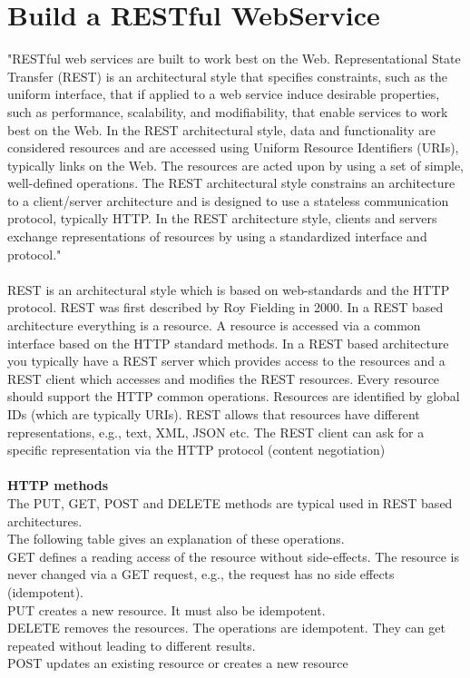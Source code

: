\documentclass[12pt]{article}
\begin{document}
\section{Build a RESTful WebService}
"RESTful web services are built to work best on the Web. Representational State Transfer (REST) is an architectural style that specifies constraints, such as the uniform interface, that if applied to a web service induce desirable properties, such as performance, scalability, and modifiability, that enable services to work best on the Web. In the REST architectural style, data and functionality are considered resources and are accessed using Uniform Resource Identifiers (URIs), typically links on the Web. The resources are acted upon by using a set of simple, well-defined operations. The REST architectural style constrains an architecture to a client/server architecture and is designed to use a stateless communication protocol, typically HTTP. In the REST architecture style, clients and servers exchange representations of resources by using a standardized interface and protocol."\cite{javaEE6}
\\\\
REST is an architectural style which is based on web-standards and the HTTP protocol. REST was first described by Roy Fielding in 2000.
In a REST based architecture everything is a resource. A resource is accessed via a common interface based on the HTTP standard methods.
In a REST based architecture you typically have a REST server which provides access to the resources and a REST client which accesses and modifies the REST resources.
Every resource should support the HTTP common operations. Resources are identified by global IDs (which are typically URIs).
REST allows that resources have different representations, e.g., text, XML, JSON etc. The REST client can ask for a specific representation via the HTTP protocol (content negotiation)  \cite{vogella}
\\\\
 \textbf{HTTP methods} \\
The PUT, GET, POST and DELETE methods are typical used in REST based architectures.
\\
The following table gives an explanation of these operations.
\\
GET defines a reading access of the resource without side-effects. The resource is never changed via a GET request, e.g., the request has no side effects (idempotent).
\\
PUT creates a new resource. It must also be idempotent.
\\
DELETE removes the resources. The operations are idempotent. They can get repeated without leading to different results.
\\
POST updates an existing resource or creates a new resource\\ \cite{vogella}
\end{document}
